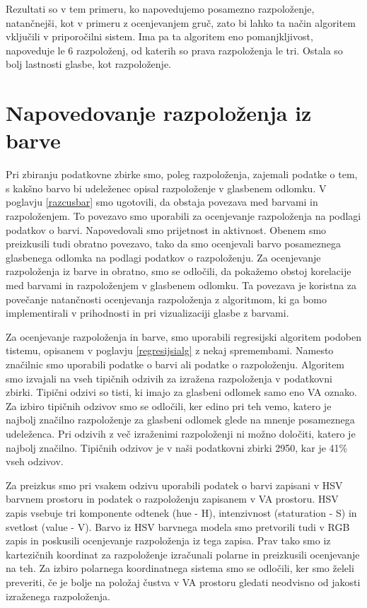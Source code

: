 \documentclass[a4paper, 12pt]{book}
\begin{document}
{Rezultati so v tem primeru, ko napovedujemo posamezno razpoloženje, natančnejši, kot v primeru z ocenjevanjem gruč, zato bi lahko ta način algoritem vključili v priporočilni sistem. Ima pa ta algoritem eno pomanjkljivost, napoveduje le 6 razpoloženj, od katerih so prava razpoloženja le tri. Ostala so bolj lastnosti glasbe, kot razpoloženje.  

\chapter{Napovedovanje razpoloženja iz barve}

Pri zbiranju podatkovne zbirke smo, poleg razpoloženja, zajemali podatke o tem, s kakšno barvo bi udeleženec opisal razpoloženje v glasbenem odlomku. V poglavju \ref{razcusbar} smo ugotovili, da obstaja povezava med barvami in razpoloženjem. To povezavo smo uporabili za ocenjevanje razpoloženja na podlagi podatkov o barvi. Napovedovali smo prijetnost in aktivnost. Obenem smo preizkusili tudi obratno povezavo, tako da smo ocenjevali barvo posameznega glasbenega odlomka na podlagi podatkov o razpoloženju. Za ocenjevanje razpoloženja iz barve in obratno, smo se odločili, da pokažemo obstoj korelacije med barvami in razpoloženjem v glasbenem odlomku. Ta povezava je koristna za povečanje natančnosti ocenjevanja razpoloženja z algoritmom, ki ga bomo implementirali v prihodnosti in pri vizualizaciji glasbe z barvami.

Za ocenjevanje razpoloženja in barve, smo uporabili regresijski algoritem podoben tistemu, opisanem v poglavju \ref{regresijsialg} z nekaj spremembami. Namesto značilnic smo uporabili podatke o barvi ali podatke o razpoloženju. Algoritem smo izvajali na vseh tipičnih odzivih za izražena razpoloženja v podatkovni zbirki. Tipični odzivi so tisti, ki imajo za glasbeni odlomek samo eno VA oznako. Za izbiro tipičnih odzivov smo se odločili, ker edino pri teh vemo, katero je najbolj značilno razpoloženje za glasbeni odlomek glede na mnenje posameznega udeleženca. Pri odzivih z več izraženimi razpoloženji ni možno določiti, katero je najbolj značilno. Tipičnih odzivov je v naši podatkovni zbirki 2950, kar je 41\% vseh odzivov. 

Za preizkus smo pri vsakem odzivu uporabili podatek o barvi zapisani v HSV barvnem prostoru in podatek o razpoloženju zapisanem v VA prostoru. HSV zapis \cite{Sural2002} vsebuje tri komponente odtenek (hue - H), intenzivnost (staturation - S) in svetlost (value - V). Barvo iz HSV barvnega modela smo pretvorili tudi v RGB zapis \cite{susstrunk1999standard} in poskusili ocenjevanje razpoloženja iz tega zapisa. Prav tako smo iz kartezičnih koordinat za razpoloženje izračunali polarne \cite{julier1997consistent} in preizkusili ocenjevanje na teh. Za izbiro polarnega koordinatnega sistema smo se odločili, ker smo želeli preveriti, če je bolje na položaj čustva v VA prostoru gledati neodvisno od jakosti izraženega razpoloženja. 

}
\end{document}

